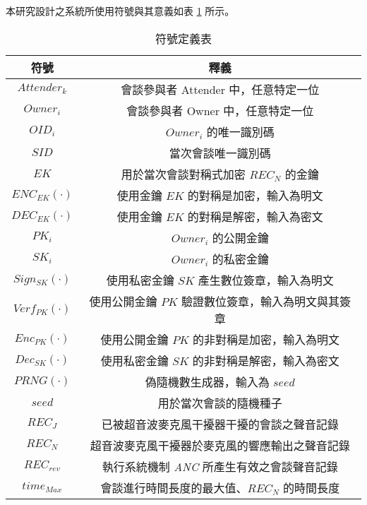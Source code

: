     本研究設計之系統所使用符號與其意義如表 \ref{table:tab.symbol} 所示。

\begin{table}[H]
    \centering
    \caption{符號定義表}
    \label{table:tab.symbol}
    \begin{tabular}{ c c }
        \hline
        \bf{符號} & \bf{釋義} \\
        \hline
        $Attender_{k}$  & 會談參與者 Attender 中，任意特定一位 \\
        $Owner_{i}$     & 會談參與者 Owner 中，任意特定一位 \\
        $OID_{i}$       & $Owner_{i}$ 的唯一識別碼 \\
        $SID$           & 當次會談唯一識別碼 \\
        $EK$            & 用於當次會談對稱式加密 $REC_{N}$ 的金鑰 \\
        $ENC_{EK}(·)$   & 使用金鑰 $EK$ 的對稱是加密，輸入為明文 \\
        $DEC_{EK}(·)$   & 使用金鑰 $EK$ 的對稱是解密，輸入為密文 \\
        $PK_{i}$        & $Owner_{i}$ 的公開金鑰 \\
        $SK_{i}$        & $Owner_{i}$ 的私密金鑰 \\
        $Sign_{SK}(·)$  & 使用私密金鑰 $SK$ 產生數位簽章，輸入為明文 \\
        $Verf_{PK}(·)$  & 使用公開金鑰 $PK$ 驗證數位簽章，輸入為明文與其簽章 \\
        $Enc_{PK}(·)$   & 使用公開金鑰 $PK$ 的非對稱是加密，輸入為明文 \\
        $Dec_{SK}(·)$   & 使用私密金鑰 $SK$ 的非對稱是解密，輸入為密文 \\
        $PRNG(·)$       & 偽隨機數生成器，輸入為 $seed$  \\
        $seed$          & 用於當次會談的隨機種子 \\
        $REC_{J}$       & 已被超音波麥克風干擾器干擾的會談之聲音記錄 \\
        $REC_{N}$       & 超音波麥克風干擾器於麥克風的響應輸出之聲音記錄 \\
        $REC_{rev}$     & 執行系統機制 {\it ANC} 所產生有效之會談聲音記錄 \\
        $time_{Max}$    & 會談進行時間長度的最大值、$REC_{N}$ 的時間長度 \\

    \end{tabular}
\end{table}


